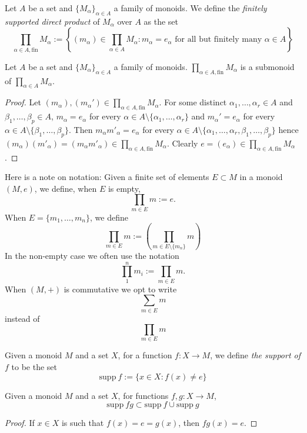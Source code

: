 \begin{definition}
    Let $A$ be a set and $\{M_\alpha\}_{\alpha\in A}$ a family of monoids. We define the \textit{finitely supported direct product} of $M_\alpha$ over $A$ as the set 
    $$\prod_{\alpha\in A,\mathrm{fin}} M_\alpha := \left\{(m_\alpha) \in \prod_{\alpha\in A} M_\alpha : m_\alpha = e_\alpha \text{ for all but finitely many } \alpha \in A \right\}$$
\end{definition}
\begin{lemma}\label{RestrictedProductMonoidIsAMonoid}
    Let $A$ be a set and $\{M_\alpha\}_{\alpha\in A}$ a family of monoids.  $\prod_{\alpha\in A,\mathrm{fin}} M_\alpha$ is a submonoid of $\prod_{\alpha \in A} M_\alpha$.
\end{lemma}
\begin{proof}
    Let $(m_\alpha),(m_\alpha')\in \prod_{\alpha\in A,\mathrm{fin}} M_\alpha$. For some distinct $\alpha_1,\dots,\alpha_r\in A$ and $\beta_1,\dots,\beta_p\in A$, $m_\alpha = e_\alpha$ for every $\alpha \in A\setminus \{\alpha_1,\dots,\alpha_r\}$ and $m_\alpha' = e_\alpha$ for every $\alpha \in A \setminus \{\beta_1,\dots,\beta_p\}$. Then $m_\alpha m'_\alpha = e_\alpha$ for every $\alpha \in A\setminus \{\alpha_1,\dots,\alpha_r,\beta_1,\dots,\beta_p\}$ hence $(m_\alpha)(m'_\alpha)=(m_\alpha m'_\alpha) \in \prod_{\alpha\in A,\mathrm{fin}} M_\alpha$. Clearly $e=(e_\alpha)\in \prod_{\alpha\in A,\mathrm{fin}} M_\alpha$. 
\end{proof}
Here is a note on notation: Given a finite set of elements $E \subset M$ in a monoid $(M,e)$, we define, when $E$ is empty,
$$
    \prod_{m\in E} m := e.
$$
When $E=\{m_1,\dots,m_n\}$, we define 
$$
    \prod_{m \in E} m := \left(\prod_{m\in E\setminus \{m_n\}} m \right)
$$
In the non-empty case we often use the notation
$$
    \prod_1^n m_i := \prod_{m\in E} m.
$$
When $(M,+)$ is commutative we opt to write 
$$
    \sum_{m\in E} m
$$ 
instead of 
$$
    \prod_{m\in E} m
$$
\begin{definition}
    Given a monoid $M$ and a set $X$, for a function $f: X\rightarrow M$, we define \emph{the support of $f$} to be the set
    $$
        \mathrm{supp}\ f := \{x\in X : f(x)\neq e\}
    $$
\end{definition}
\begin{lemma}\label{SupportLemma}
    Given a monoid $M$ and a set $X$, for functions $f,g: X\rightarrow M$,
    $$
        \mathrm{supp} \ fg \subset \mathrm{supp} \ f \cup \mathrm{supp} \ g 
    $$
\end{lemma}
\begin{proof}
    If $x\in X$ is such that $f(x)=e=g(x)$, then $fg(x) = e$.
\end{proof}
